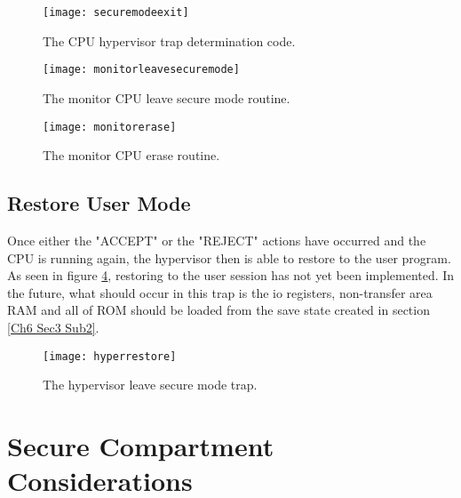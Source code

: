 \begin{figure}
  \centering
  \texttt{[image: securemodeexit]}
  \caption{The CPU hypervisor trap determination code.}
  \label{fig:securemodeexit}
\end{figure}

\begin{figure}
  \centering
  \texttt{[image: monitorleavesecuremode]}
  \caption{The monitor CPU leave secure mode routine.}
  \label{fig:monitorleavesecuremode}
\end{figure}

\begin{figure}
  \centering
  \texttt{[image: monitorerase]}
  \caption{The monitor CPU erase routine.}
  \label{fig:monitorerase}
\end{figure}


\subsection{Restore User Mode}

\label{Ch6 Sec3 Sub5}

Once either the "ACCEPT" or the "REJECT" actions have occurred and the CPU is running again, the hypervisor then is able to restore to the user program. As seen in figure \ref{fig:hyperrestore}, restoring to the user session has not yet been implemented. In the future, what should occur in this trap is the io registers, non-transfer area RAM and all of ROM should be loaded from the save state created in section \ref{Ch6 Sec3 Sub2}.

\begin{figure}
  \centering
  \texttt{[image: hyperrestore]}
  \caption{The hypervisor leave secure mode trap.}
  \label{fig:hyperrestore}
\end{figure}


\section{Secure Compartment Considerations}

\label{Ch6 Sec4}

